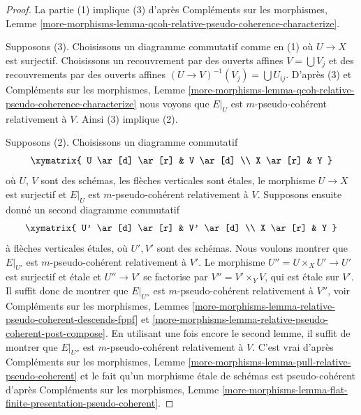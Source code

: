 \begin{proof}
La partie (1) implique (3) d'après Compléments sur les morphismes, Lemme
\ref{more-morphisms-lemma-qcoh-relative-pseudo-coherence-characterize}.

\medskip\noindent
Supposons (3). Choisissons un diagramme commutatif comme en (1) où $U \to X$ est surjectif.
Choisissons un recouvrement par des ouverts affines $V = \bigcup V_j$ et des recouvrements par des ouverts affines
$(U \to V)^{-1}(V_j) = \bigcup U_{ij}$. D'après (3) et Compléments sur les morphismes, Lemme
\ref{more-morphisms-lemma-qcoh-relative-pseudo-coherence-characterize}
nous voyons que $E|_U$ est $m$-pseudo-cohérent relativement à $V$.
Ainsi (3) implique (2).

\medskip\noindent
Supposons (2). Choisissons un diagramme commutatif
$$
\xymatrix{
U \ar[d] \ar[r] & V \ar[d] \\
X \ar[r] & Y
}
$$
où $U$, $V$ sont des schémas, les flèches verticales sont étales, le
morphisme $U \to X$ est surjectif et $E|_U$ est $m$-pseudo-cohérent
relativement à $V$. Supposons ensuite donné un second diagramme commutatif
$$
\xymatrix{
U' \ar[d] \ar[r] & V' \ar[d] \\
X \ar[r] & Y
}
$$
à flèches verticales étales, où $U', V'$ sont des schémas. Nous voulons montrer
que $E|_{U'}$ est $m$-pseudo-cohérent relativement à $V'$.
Le morphisme $U'' = U \times_X U' \to U'$ est surjectif et étale
et $U'' \to V'$ se factorise par $V'' = V' \times_Y V$, qui
est étale sur $V'$. Il suffit donc de montrer que $E|_{U''}$
est $m$-pseudo-cohérent relativement à $V''$, voir
Compléments sur les morphismes, Lemmes
\ref{more-morphisms-lemma-relative-pseudo-coherent-descends-fppf} et
\ref{more-morphisms-lemma-relative-pseudo-coherent-post-compose}.
En utilisant une fois encore le second lemme, il suffit de montrer que
$E|_{U''}$ est $m$-pseudo-cohérent relativement à $V$.
C'est vrai d'après Compléments sur les morphismes, Lemme
\ref{more-morphisms-lemma-pull-relative-pseudo-coherent}
et le fait qu'un morphisme étale de schémas est pseudo-cohérent d'après
Compléments sur les morphismes, Lemme
\ref{more-morphisms-lemma-flat-finite-presentation-pseudo-coherent}.
\end{proof}

